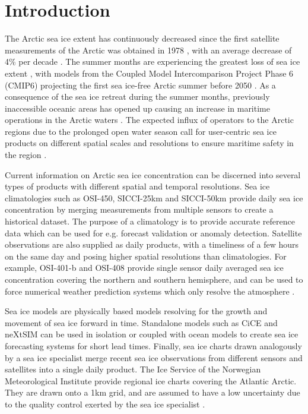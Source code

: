 \documentclass[../main/thesis.tex]{subfiles}
\begin{document}
\section{Introduction}
The Arctic sea ice extent has continuously decreased since the first satellite measurements of the Arctic was obtained in 1978 \cite{Serreze2019}, with an average decrease of 4\% per decade \cite{Cavalieri2012}. The summer months are experiencing the greatest loss of sea ice extent \cite{Comiso2017}, with models from the Coupled Model Intercomparison Project Phase 6 (CMIP6) projecting the first sea ice-free Arctic summer before 2050 \cite{Notz2020}. As a consequence of the sea ice retreat during the summer months, previously inaccessible oceanic areas has opened up causing an increase in maritime operations in the Arctic waters \cite{Eguiluz2016}. The expected influx of operators to the Arctic regions due to the prolonged open water season call for user-centric sea ice products on different spatial scales and resolutions to ensure maritime safety in the region \cite{Wagner2020, Veland2021}.

Current information on Arctic sea ice concentration can be discerned into several types of products with different spatial and temporal resolutions. Sea ice climatologies such as OSI-450, SICCI-25km and SICCI-50km provide daily sea ice concentration by merging measurements from multiple sensors to create a historical dataset. The purpose of a climatology is to provide accurate reference data \cite{Lavergne2019} which can be used for e.g. forecast validation or anomaly detection. Satellite observations are also supplied as daily products, with a timeliness of a few hours on the same day and posing higher spatial resolutions than climatologies. For example, OSI-401-b \cite{Tonboe2017} and OSI-408 \cite{Lavelle2016} provide single sensor daily averaged sea ice concentration covering the northern and southern hemisphere, and can be used to force numerical weather prediction systems which only resolve the atmosphere \cite{Mueller2017}.

Sea ice models are physically based models resolving for the growth and movement of sea ice forward in time. Standalone models such as CiCE \cite{Hunke1997} and neXtSIM \cite{Williams2021} can be used in isolation or coupled with ocean models \cite{Roehrs2022} to create sea ice forecasting systems for short lead times. Finally, sea ice charts drawn analogously by a sea ice specialist merge recent sea ice observations from different sensors and satellites into a single daily product. The Ice Service of the Norwegian Meteorological Institute provide regional ice charts covering the Atlantic Arctic. They are drawn onto a 1km grid, and are assumed to have a low uncertainty due to the quality control exerted by the sea ice specialist \cite{Dinessen2020}.
\end{document}
